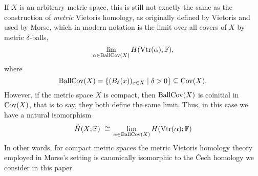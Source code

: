 If $X$ is an arbitrary metric space, this is still not exactly the same as the construction of \emph{metric} Vietoris homology, as originally defined by Vietoris \cite{Vietoris.1927} and used by Morse, which in modern notation is the limit over all covers of $X$ by metric $\delta$-balls,
\begin{equation*}
\lim_{\alpha \in \operatorname{BallCov}(X)} H (\operatorname{Vtr} (\alpha); \mathbb{F}),
\end{equation*}
where
\begin{equation*}
\operatorname{BallCov} (X) = \left\{ ( B_{\delta} (x) )_{x \in X} \mid \delta > 0 \right\}
\subseteq \operatorname{Cov} (X).
\end{equation*}
However, if the metric space $X$ is compact, then $\operatorname{BallCov} (X)$ is coinitial in $\operatorname{Cov} (X)$, that is to say, they both define the same limit.
Thus, in this case we have a natural isomorphism
\begin{equation*}
\check{H} (X; \mathbb{F}) \ \cong \,
\lim_{\alpha \in \operatorname{BallCov}(X)} H (\operatorname{Vtr} (\alpha); \mathbb{F})
\end{equation*}
In other words, for compact metric spaces the metric Vietoris homology theory employed in Morse's setting is canonically isomorphic to the \v{C}ech homology we consider in this paper.